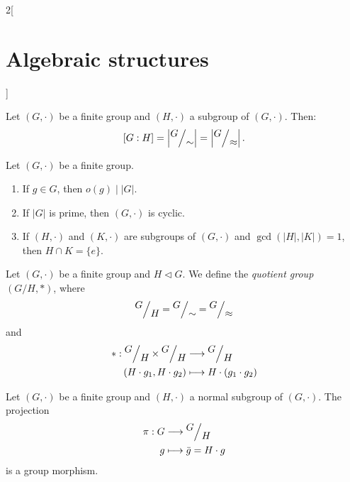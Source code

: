 \documentclass[class=article,10pt,crop=false]{standalone}
\begin{document}
\begin{multicols}{2}[\section{Algebraic structures}]
\begin{definition}
\end{definition}
\begin{corollary}
Let $(G,\cdot)$ be a finite group and $(H,\cdot)$ a subgroup of $(G,\cdot)$. Then: $$[G:H]=\left|\quot{G}{\sim}\right|=\left|\quot{G}{\approx}\right|.$$
\end{corollary}
\begin{corollary}
Let $(G,\cdot)$ be a finite group. 
\begin{enumerate}
    \item If $g\in G$, then $o(g)\mid |G|$.
    \item If $|G|$ is prime, then $(G,\cdot)$ is cyclic.
    \item If $(H,\cdot)$ and $(K,\cdot)$ are subgroups of $(G,\cdot)$ and $\gcd(|H|,|K|)=1$, then $H\cap K=\{e\}$.
\end{enumerate}
\end{corollary}
\begin{definition}
Let $(G,\cdot)$ be a finite group and $H\lhd G$. We define the \textit{quotient group $\left(G/H,*\right)$}, where $$\quot{G}{H}=\quot{G}{\sim}=\quot{G}{\approx}$$ and 
\begin{align*}
    *:\quot{G}{H}\times\quot{G}{H}&\longrightarrow\quot{G}{H}\\
    (H\cdot g_1,H\cdot g_2)&\longmapsto H\cdot (g_1\cdot g_2)
\end{align*}
\end{definition}
\begin{lemma}
Let $(G,\cdot)$ be a finite group and $(H,\cdot)$ a normal subgroup of $(G,\cdot)$. The projection 
\begin{align*}
    \pi:G&\longrightarrow\quot{G}{H}\\
    g&\longmapsto\Bar{g}=H\cdot g
\end{align*}
is a group morphism.
\end{lemma}

\end{multicols}
\end{document}
